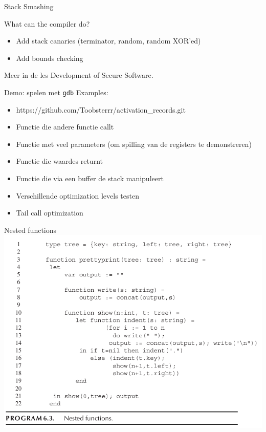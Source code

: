 \documentclass{beamer}
\begin{document}
\begin{frame}{Stack Smashing}
	\begin{block}{What can the compiler do?}
		\begin{itemize}
		    \item Add stack canaries (terminator, random, random XOR'ed)
		    \item Add bounds checking
		\end{itemize}
	\end{block}
	Meer in de les Development of Secure Software.
\end{frame}

\begin{frame}{Demo: spelen met \texttt{gdb}}
    Examples:
    \begin{itemize}
        \item https://github.com/Toobsterrr/activation\_records.git
        \item Functie die andere functie callt
        \item Functie met veel parameters (om spilling van de registers te demonstreren)
        \item Functie die waardes returnt
        \item Functie die via een buffer de stack manipuleert
        \item Verschillende optimization levels testen
        \item Tail call optimization
    \end{itemize}
\end{frame}

\begin{frame}{Nested functions}
    \includegraphics[width=\textwidth]{nested_functions.png}
\end{frame}
\end{document}
